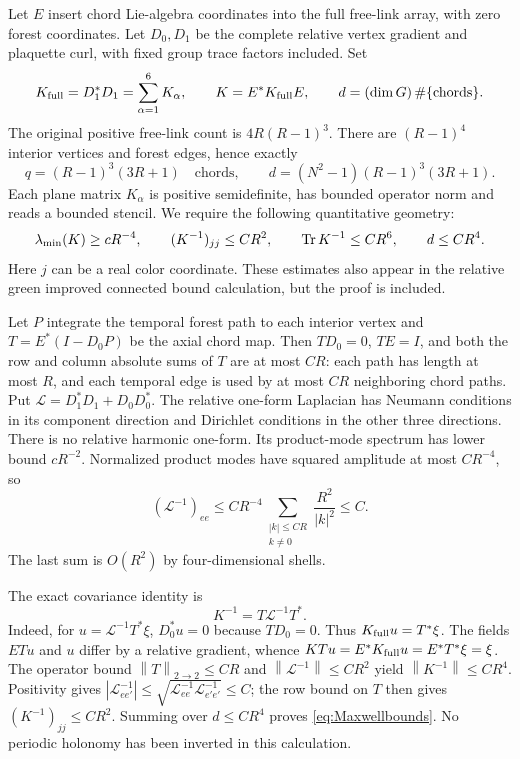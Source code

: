 \documentclass[11pt,letterpaper]{article}
\numberwithin{equation}{section}
\theoremstyle{definition}\newtheorem{definition}[theorem]{Definition}
\theoremstyle{remark}\newtheorem{remark}[theorem]{Remark}
\newcommand{\norm}[1]{\left\lVert #1\right\rVert}
\begin{document}
Let $E$ insert chord Lie-algebra coordinates into the full free-link array, with zero forest coordinates. Let $D_0,D_1$ be the complete relative vertex gradient and plaquette curl, with fixed group trace factors included. Set
\[
 K_{\rm full}=D_1^*D_1=\sum_{\alpha=1}^{6}K_\alpha,
 \qquad K=E^*K_{\rm full}E,
 \qquad d=(\dim G)\,\#\{\text{chords}\}.
\]
The original positive free-link count is $4R(R-1)^3$. There are $(R-1)^4$ interior vertices and forest edges, hence exactly
\[
 q=(R-1)^3(3R+1)\quad\text{chords},\qquad
 d=(N^2-1)(R-1)^3(3R+1).
\]
Each plane matrix $K_\alpha$ is positive semidefinite, has bounded operator norm and reads a bounded stencil. We require the following quantitative geometry:
\begin{equation}
 \lambda_{\min}(K)\ge cR^{-4},\qquad
 (K^{-1})_{jj}\le CR^2,\qquad
 \operatorname{Tr} K^{-1}\le CR^6,\qquad d\le CR^4.
 \label{eq:Maxwellbounds}
\end{equation}
Here $j$ can be a real color coordinate. These estimates also appear in the relative green improved connected bound calculation, but the proof is included.

Let $P$ integrate the temporal forest path to each interior vertex and $T=E^*(I-D_0P)$ be the axial chord map. Then $TD_0=0$, $TE=I$, and both the row and column absolute sums of $T$ are at most $CR$: each path has length at most $R$, and each temporal edge is used by at most $CR$ neighboring chord paths. Put
$\mathcal L=D_1^*D_1+D_0D_0^*$. The relative one-form Laplacian has Neumann conditions in its component direction and Dirichlet conditions in the other three directions. There is no relative harmonic one-form. Its product-mode spectrum has lower bound $cR^{-2}$. Normalized product modes have squared amplitude at most $CR^{-4}$, so
\[
 (\mathcal L^{-1})_{ee}\le
 CR^{-4}\sum_{\substack{|k|\le CR\\ k\ne0}}\frac{R^2}{|k|^2}\le C.
\]
The last sum is $O(R^2)$ by four-dimensional shells.

The exact covariance identity is
\begin{equation}
 K^{-1}=T\mathcal L^{-1}T^*.
 \label{eq:treecovariance}
\end{equation}
Indeed, for $u=\mathcal L^{-1}T^*\xi$, $D_0^*u=0$ because $TD_0=0$. Thus $K_{\rm full}u=T^*\xi$. The fields $ETu$ and $u$ differ by a relative gradient, whence
$KTu=E^*K_{\rm full}u=E^*T^*\xi=\xi$.
The operator bound $\norm T_{2\to2}\le CR$ and $\norm{\mathcal L^{-1}}\le CR^2$ yield $\norm{K^{-1}}\le CR^4$. Positivity gives
$|\mathcal L^{-1}_{ee'}|\le\sqrt{\mathcal L^{-1}_{ee}\mathcal L^{-1}_{e'e'}}\le C$; the row bound on $T$ then gives $(K^{-1})_{jj}\le CR^2$. Summing over $d\le CR^4$ proves \eqref{eq:Maxwellbounds}. No periodic holonomy has been inverted in this calculation.
\end{document}
